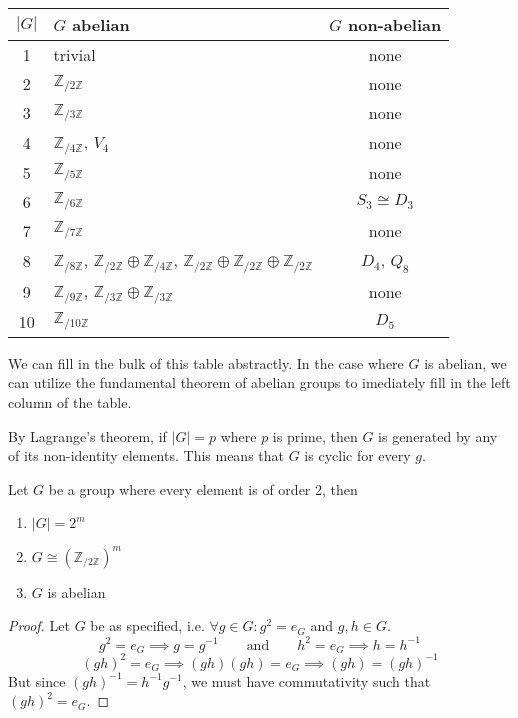 \begin{center}
   \begin{tabular}{|c|l|c|}
      \(|G|\) & \(G\) abelian & \(G\) non-abelian \\
      \hline
      1 & trivial                                & none\\
      2 & \(\mathbb{Z}_{/2\mathbb{Z}}\)          & none \\
      3 & \(\mathbb{Z}_{/3\mathbb{Z}}\)          & none \\
      4 & \(\mathbb{Z}_{/4\mathbb{Z}}\), \(V_4\) & none \\
      5 & \(\mathbb{Z}_{/5\mathbb{Z}}\)          & none \\
      \hline
      6  & \(\mathbb{Z}_{/6\mathbb{Z}}\)         & \(S_3 \cong D_3\) \\
      7  & \(\mathbb{Z}_{/7\mathbb{Z}}\)         & none \\
      8  & \(\mathbb{Z}_{/8\mathbb{Z}}\), \(\mathbb{Z}_{/2\mathbb{Z}} \oplus \mathbb{Z}_{/4\mathbb{Z}}\), \(\mathbb{Z}_{/2\mathbb{Z}} \oplus \mathbb{Z}_{/2\mathbb{Z}} \oplus \mathbb{Z}_{/2\mathbb{Z}}\)           & \(D_4\), \(Q_8\) \\
      9  & \(\mathbb{Z}_{/9\mathbb{Z}}\), \(\mathbb{Z}_{/3\mathbb{Z}} \oplus \mathbb{Z}_{/3\mathbb{Z}}\) & none \\
      10 & \(\mathbb{Z}_{/10\mathbb{Z}}\)        & \(D_5\) \\
   \end{tabular}
\end{center}

We can fill in the bulk of this table abstractly.
In the case where \(G\) is abelian, we can utilize the fundamental theorem of abelian groups to imediately fill in the left column of the table.

By Lagrange's theorem, if \(|G| = p\) where \(p\) is prime, then \(G\) is generated by any of its non-identity elements.
This means that \(G\) is cyclic for every \(g\).

\begin{proposition}
   Let \(G\) be a group where every element is of order 2, then
   \begin{enumerate}[label=\roman*, align=Center]
      \item \(|G| = 2^m\) %
      \item \(G \cong (\mathbb{Z}_{/2\mathbb{Z}})^m\)
      \item \(G\) is abelian
   \end{enumerate}
\end{proposition}
\begin{proof}
   Let \(G\) be as specified, i.e. \(\forall g \in G: g^2 = e_G\) and \(g, h \in G\).
   \[g^2 = e_G \implies g = g^{-1} \qquad\text{and}\qquad h^2 = e_G \implies h = h^{-1}\]
   \[(gh)^2 = e_G \implies (gh)(gh) = e_G \implies (gh) = (gh)^{-1}\]
   But since \((gh)^{-1} = h^{-1}g^{-1}\), we must have commutativity such that \((gh)^2 = e_G\).
\end{proof}

